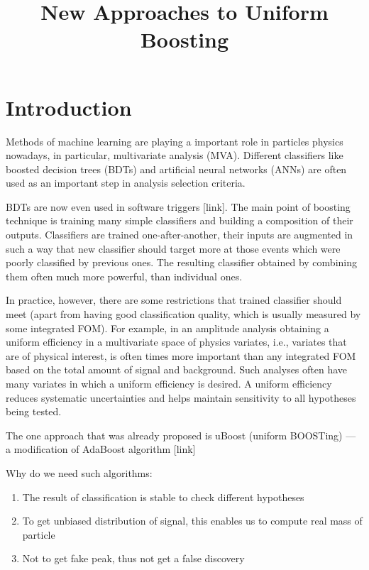 \documentclass[12pt]{article}
\title{New Approaches to Uniform Boosting }
\author{
}
\theoremstyle{definition}
\theoremstyle{remark}
\begin{document}
\maketitle



\section{Introduction}

Methods of machine learning are playing a important role in particles physics nowadays, in particular, multivariate analysis (MVA). 
Different classifiers like boosted decision trees (BDTs) and artificial neural networks (ANNs) are often used as an important step in analysis selection criteria. 

BDTs are now even used in software triggers [link]. The main point of boosting technique is training many simple classifiers and building a composition of their outputs.
Classifiers are trained one-after-another, their inputs are augmented in such a way that new classifier should target more at those events which were poorly classified by previous ones. The resulting classifier obtained by combining them often much more powerful, than individual ones.


In practice, however, there are some restrictions that trained classifier should meet (apart from having good classification quality, which is usually measured by some integrated FOM). For example, in an amplitude analysis obtaining a uniform efficiency in a multivariate space of physics variates, i.e., variates that are of physical interest, is often times more important than any integrated FOM based on the total amount of signal and background. Such analyses often have many variates in which a uniform efficiency is desired. A uniform efficiency reduces systematic uncertainties and helps maintain sensitivity to all hypotheses being tested.

The one approach that was already proposed is uBoost (uniform BOOSTing) --- a modification of AdaBoost algorithm [link]

Why do we need such algorithms:

\begin{enumerate}
	\item The result of classification is stable to check different hypotheses
	\item To get unbiased distribution of signal, this enables us to compute real mass of particle
	\item Not to get fake peak, thus not get a false discovery
\end{enumerate}
\end{document}

